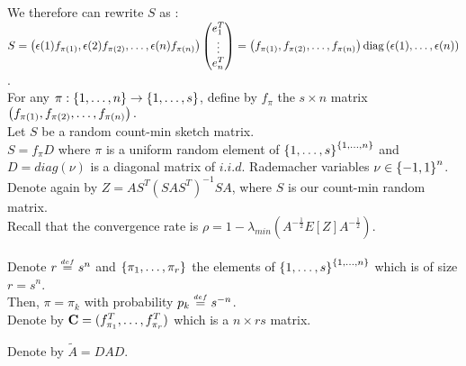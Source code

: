 We therefore can rewrite $S$ as :\\
 $S = \left( \epsilon(1)f_{\pi(1)},\epsilon(2)f_{\pi(2)},\dots,\epsilon(n)f_{\pi(n)} \right) \begin{pmatrix} e_{1}^{T} \\ \vdots \\ e_{n}^{T} \end{pmatrix} = \left( f_{\pi(1)}, f_{\pi(2)},\dots, f_{\pi(n)} \right) \text{diag}\left(\epsilon(1),\dots,\epsilon(n)\right)$.\\
 

For any $\pi : \left\{1,\dots,n\right\} \rightarrow \left\{1,\dots,s\right\} $, define by $f_{\pi}$ the $s\times n$ matrix $\left( f_{\pi(1)}, f_{\pi(2)},\dots, f_{\pi(n)} \right).$\\

Let $S$ be a random count-min sketch matrix.\\
 $S = f_{\pi} D$ where $\pi$ is a uniform random element of $\left\{1,\dots,s\right\}^{\left\{1,\dots,n\right\}}$ and $D = diag(\nu)$ is a diagonal matrix of $i.i.d.$ Rademacher variables $\nu \in \left\{-1,1\right\}^{n}$. \\

Denote again by $Z = A S^{T} (S A S^{T})^{-1} S A$, where $S$ is our count-min random matrix.\\
Recall that the convergence rate is  $\rho = 1 - \lambda_{min}(A^{-\frac12}E[Z]A^{-\frac12}  )$.\\\\

Denote $r \stackrel{{\scriptscriptstyle{def}}}{=} s^{n}$ and $\left\{\pi_{1},\dots,\pi_{r}\right\}$ the elements of $\left\{1,\dots,s\right\}^{\left\{1,\dots,n\right\}}$ which is of size $r = s^{n}$.\\
Then, $\pi = \pi_{k}$ with probability $p_{k} \stackrel{{\scriptscriptstyle{def}}}{=} s^{-n}$.\\
Denote by $\bold{C} = (f_{\pi_{1}}^{T},\dots,f_{\pi_{r}}^{T})$ which is a $ n \times r s$ matrix.\\


 
\pr 

Denote by $\tilde{A} = D A D.$\\

